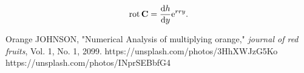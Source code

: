 \documentclass[dvipdfmx,a4j,11pt]{article}
\begin{document}
\begin{equation}
	\label{eq:1}
	\operatorname{rot} {\bf C} = \frac{{\rm d} h}{{\rm d} y} {\rm e}^{rry}.
\end{equation}

%
%
%
\begin{thebibliography}{99}
	 Orange JOHNSON, "Numerical Analysis of multiplying orange," {\it journal of red fruits}, Vol. 1, No. 1, 2099.
	 https://unsplash.com/photos/3HhXWJzG5Ko
	 https://unsplash.com/photos/INprSEBbfG4
\end{thebibliography}
%
%
%
\end{document}
